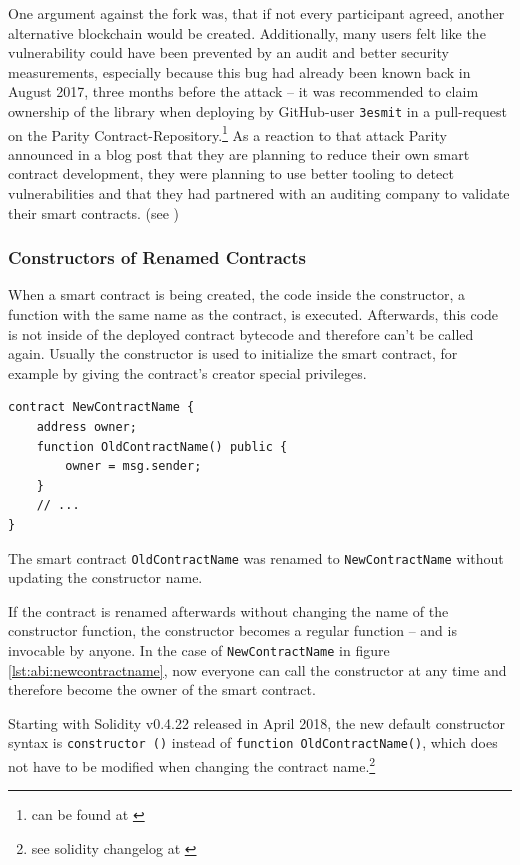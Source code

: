 One argument against the fork was, that if not every participant agreed, another alternative blockchain would be created. Additionally, many users felt like the vulnerability could have been prevented by an audit and better security measurements, especially because this bug had already been known back in August 2017, three months before the attack -- it was recommended to claim ownership of the library when deploying by GitHub-user \texttt{3esmit} in a pull-request on the Parity Contract-Repository.\footnote{can be found at \cite{github:parityinitialize}} As a reaction to that attack Parity announced in a blog post that they are planning to reduce their own smart contract development, they were planning to use better tooling to detect vulnerabilities and that they had partnered with an auditing company to validate their smart contracts. (see \cite{parity:newdevprocesses})

\subsubsection{Constructors of Renamed Contracts}
When a smart contract is being created, the code inside the constructor, a function with the same name as the contract, is executed. Afterwards, this code is not inside of the deployed contract bytecode and therefore can't be called again. Usually the constructor is used to initialize the smart contract, for example by giving the contract's creator special privileges.

\begin{listing}[H]
	\begin{verbatim}
contract NewContractName {
    address owner;
    function OldContractName() public {
        owner = msg.sender;
    }
    // ...
}
    \end{verbatim}
	\caption{The smart contract \texttt{OldContractName} was renamed to \texttt{NewContractName} without updating the constructor name.}
	\label{lst:abi:newcontractname}
\end{listing}

If the contract is renamed afterwards without changing the name of the constructor function, the constructor becomes a regular function -- and is invocable by anyone. In the case of \texttt{NewContractName} in figure \ref{lst:abi:newcontractname}, now everyone can call the constructor at any time and therefore become the owner of the smart contract.

Starting with Solidity v0.4.22 released in April 2018, the new default constructor syntax is \texttt{constructor ()} instead of \texttt{function OldContractName()}, which does not have to be modified when changing the contract name.\footnote{see solidity changelog at \cite{solidity:changelog}}

